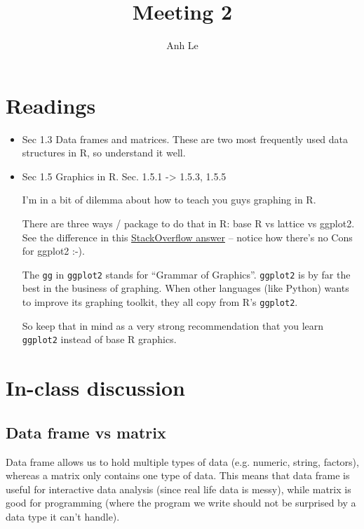 \documentclass{article}\usepackage[]{graphicx}\usepackage[]{color}
\title{Meeting 2}
\author{Anh Le}
\begin{document}
\maketitle

\section{Readings}

\begin{itemize}
  \item Sec 1.3 Data frames and matrices. These are two most frequently used data structures in R, so understand it well.

  \item Sec 1.5 Graphics in R. Sec. 1.5.1 -> 1.5.3, 1.5.5

  I'm in a bit of dilemma about how to teach you guys graphing in R.

  There are three ways / package to do that in R: base R vs lattice vs ggplot2. See the difference in this \href{http://stackoverflow.com/questions/2759556/r-what-are-the-pros-and-cons-of-using-lattice-versus-ggplot2}{StackOverflow answer} -- notice how there's no Cons for ggplot2 :-).

  The \verb`gg` in \verb`ggplot2` stands for ``Grammar of Graphics''. \verb`ggplot2` is by far the best in the business of graphing. When other languages (like Python) wants to improve its graphing toolkit, they all copy from R's \verb`ggplot2`.

  So keep that in mind as a very strong recommendation that you learn \verb`ggplot2` instead of base R graphics.
\end{itemize}

\section{In-class discussion}

\subsection{Data frame vs matrix}

Data frame allows us to hold multiple types of data (e.g. numeric, string, factors), whereas a matrix only contains one type of data. This means that data frame is useful for interactive data analysis (since real life data is messy), while matrix is good for programming (where the program we write should not be surprised by a data type it can't handle).
\end{document}
